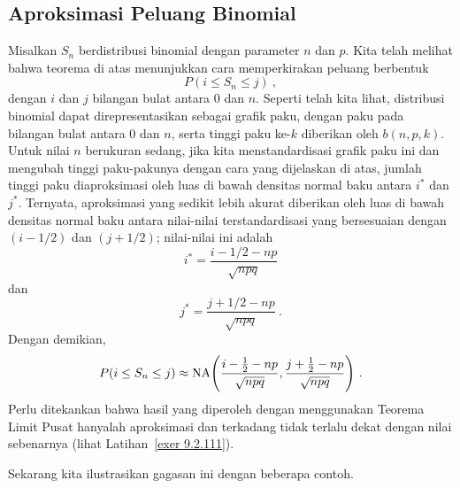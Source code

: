 \subsection*{Aproksimasi Peluang Binomial}

Misalkan $S_n$ berdistribusi binomial dengan parameter $n$ dan $p$.  Kita telah melihat bahwa
teorema di atas menunjukkan cara memperkirakan peluang berbentuk 
\begin{equation}
P(i \le S_n \le j)\ ,
\label{eq 9.2}
\end{equation}
dengan $i$ dan $j$ bilangan bulat antara 0 dan $n$.  Seperti telah kita lihat, distribusi binomial dapat
direpresentasikan sebagai grafik paku, dengan paku pada bilangan bulat antara 0 dan $n$, serta
tinggi paku ke-$k$ diberikan oleh $b(n, p, k)$.  Untuk nilai $n$ berukuran sedang, jika kita
menstandardisasi grafik paku ini dan mengubah tinggi paku-pakunya dengan cara yang
dijelaskan di atas, jumlah tinggi paku diaproksimasi oleh luas di bawah
densitas normal baku antara $i^*$ dan $j^*$.  Ternyata, aproksimasi yang sedikit lebih akurat
diberikan oleh luas di bawah densitas normal baku antara nilai-nilai terstandardisasi
yang bersesuaian dengan $(i - 1/2)$ dan $(j + 1/2)$; nilai-nilai ini adalah
$$i^* = \frac{i - 1/2 - np}{\sqrt {npq}}$$
dan
$$j^* = \frac{j + 1/2 - np}{\sqrt {npq}}\ .$$
Dengan demikian,
$$P(i \le S_n \le j) \approx {\rm NA}\Biggl({{i - {1\over 2} - np}\over{\sqrt {npq}}} ,
{{j + {1\over 2} - np}\over{\sqrt {npq}}}\Biggr)\ .$$
Perlu ditekankan bahwa hasil yang diperoleh dengan menggunakan Teorema Limit Pusat hanyalah
aproksimasi dan terkadang tidak terlalu dekat dengan nilai sebenarnya (lihat Latihan~\ref{exer 9.2.111}). 
\par
Sekarang kita ilustrasikan gagasan ini dengan beberapa contoh.


